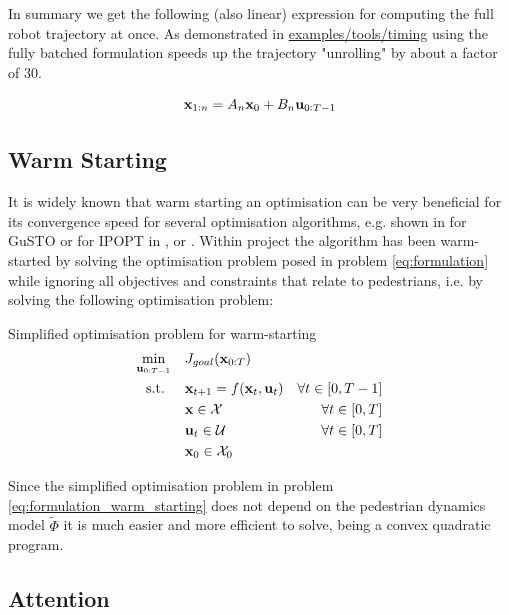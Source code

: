 In summary we get the following (also linear) expression for computing the full robot trajectory at once. As demonstrated in \href{https://github.com/simon-schaefer/mantrap/blob/master/examples/tools/timing.ipynb}{examples/tools/timing} using the fully batched formulation speeds up the trajectory "unrolling" by about a factor of 30.  

\begin{equation}
\mathbf{x}_{1:n} = A_n \mathbf{x}_0 + B_n \mathbf{u}_{0:T-1}
\label{eq:dynamics_stacked}
\end{equation}

\subsection{Warm Starting}
\label{text:approach/runtime/warm_starting}
It is widely known that warm starting an optimisation can be very beneficial for its convergence speed for several optimisation algorithms, e.g. shown in \cite{Banerjee2020} for \ac{GuSTO} or for \ac{IPOPT} in \cite{Shahzad2010}, \cite{John2008} or \cite{Spielberge2019}.
\newline
Within project \project the algorithm has been warm-started by solving the optimisation problem posed in problem \ref{eq:formulation} while ignoring all objectives and constraints that relate to pedestrians, i.e. by solving the following optimisation problem: \\

\begin{problem}{Simplified \project optimisation problem for warm-starting}
\begin{align}
\min_{\mathbf{u}_{0:T-1}} \quad & J_{goal}(\mathbf{x}_{0:T}) \\
\textrm{s.t. } \quad & \mathbf{x}_{t+1} = f(\mathbf{x}_t, \mathbf{u}_t) & \forall t \in [0, T - 1] \\
& \mathbf{x} \in \mathcal{X} & \forall t \in [0, T]\\
& \mathbf{u}_t \in \mathcal{U} & \forall t \in [0, T]\\
& \mathbf{x}_0 \in \mathcal{X}_0
\end{align} 
\label{eq:formulation_warm_starting}
\end{problem}

Since the simplified optimisation problem in problem \ref{eq:formulation_warm_starting} does not depend on the pedestrian dynamics model $\tilde{\Phi}$ it is much easier and more efficient to solve, being a convex quadratic program.



\subsection{Attention}
\label{text:approach/runtime/filtering}
